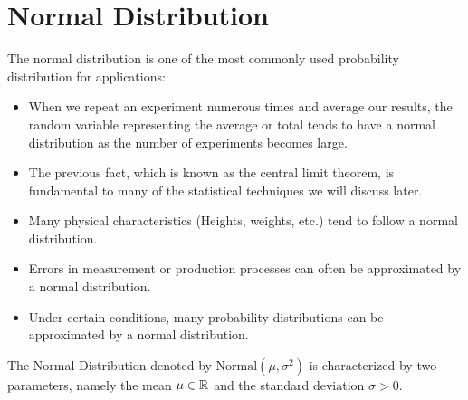 \documentclass[compress]{beamer}
\begin{document}
\section{Normal Distribution}



\begin{frame}
The normal distribution is one of the most commonly used probability distribution for applications:
\begin{itemize}
\item  When we repeat an experiment numerous times and average our results, the random variable representing the average or total tends to have a normal distribution as the number of experiments becomes large.
\item   The previous fact, which is known as the central limit theorem, is fundamental to many of the statistical techniques we will discuss later.
\item  Many physical characteristics (Heights, weights, etc.) tend to follow a normal distribution.
\item  Errors in measurement or production processes can often be
approximated by a normal distribution.
\item Under certain conditions, many probability distributions can be
approximated by a normal distribution.
\end{itemize}
\end{frame}



\begin{frame}
The Normal Distribution denoted by $\text{Normal}(\mu, \sigma^2)$ is characterized by two parameters, namely the mean $\mu\in \mathbb{R}$ and the standard deviation $\sigma>0$.


\end{frame}
\end{document}
